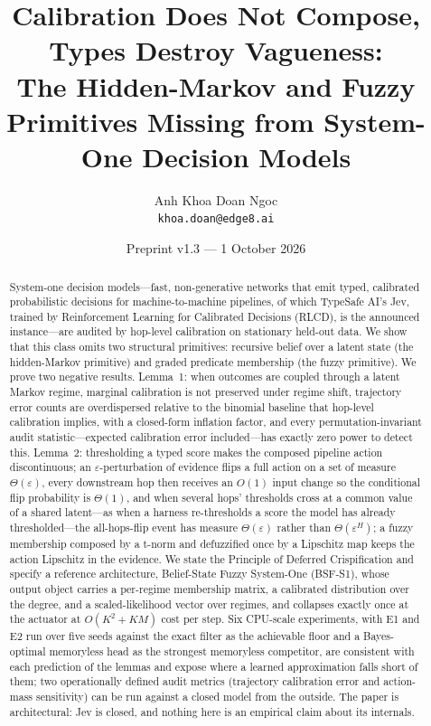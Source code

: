 \documentclass[11pt,a4paper]{article}
\title{\textbf{Calibration Does Not Compose, Types Destroy Vagueness:}\\[2pt]
\large The Hidden-Markov and Fuzzy Primitives Missing from System-One Decision Models}
\author{Anh Khoa Doan Ngoc\\ \small \texttt{khoa.doan@edge8.ai}}
\date{\small Preprint v1.3 --- 1 October 2026}
\numberwithin{equation}{section}
\theoremstyle{plain}
\theoremstyle{definition}
\theoremstyle{remark}
\begin{document}
\maketitle

\begin{abstract}
System-one decision models---fast, non-generative networks that emit typed, calibrated probabilistic decisions for machine-to-machine pipelines, of which TypeSafe AI's Jev, trained by Reinforcement Learning for Calibrated Decisions (RLCD), is the announced instance---are audited by hop-level calibration on stationary held-out data. We show that this class omits two structural primitives: recursive belief over a latent state (the hidden-Markov primitive) and graded predicate membership (the fuzzy primitive). We prove two negative results. Lemma~1: when outcomes are coupled through a latent Markov regime, marginal calibration is not preserved under regime shift, trajectory error counts are overdispersed relative to the binomial baseline that hop-level calibration implies, with a closed-form inflation factor, and every permutation-invariant audit statistic---expected calibration error included---has exactly zero power to detect this. Lemma~2: thresholding a typed score makes the composed pipeline action discontinuous; an $\varepsilon$-perturbation of evidence flips a full action on a set of measure $\Theta(\varepsilon)$, every downstream hop then receives an $O(1)$ input change so the conditional flip probability is $\Theta(1)$, and when several hops' thresholds cross at a common value of a shared latent---as when a harness re-thresholds a score the model has already thresholded---the all-hops-flip event has measure $\Theta(\varepsilon)$ rather than $\Theta(\varepsilon^H)$; a fuzzy membership composed by a t-norm and defuzzified once by a Lipschitz map keeps the action Lipschitz in the evidence. We state the Principle of Deferred Crispification and specify a reference architecture, Belief-State Fuzzy System-One (BSF-S1), whose output object carries a per-regime membership matrix, a calibrated distribution over the degree, and a scaled-likelihood vector over regimes, and collapses exactly once at the actuator at $O(K^2+KM)$ cost per step. Six CPU-scale experiments, with E1 and E2 run over five seeds against the exact filter as the achievable floor and a Bayes-optimal memoryless head as the strongest memoryless competitor, are consistent with each prediction of the lemmas and expose where a learned approximation falls short of them; two operationally defined audit metrics (trajectory calibration error and action-mass sensitivity) can be run against a closed model from the outside. The paper is architectural: Jev is closed, and nothing here is an empirical claim about its internals.
\end{abstract}
\end{document}

